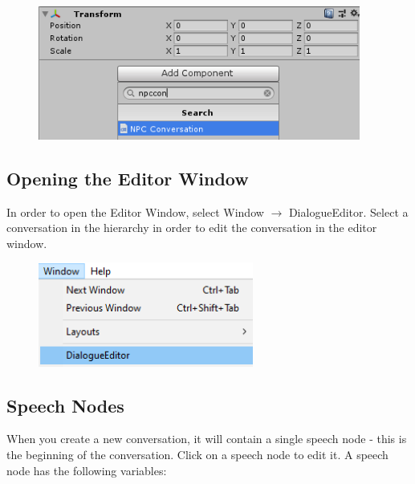 \documentclass[a4paper,12pt]{article}
\begin{document}
\begin{figure}[ht]
\centering
\includegraphics[width=300pt, keepaspectratio]{img/AddNpcConversation.png}
\end{figure}



\subsection{Opening the Editor Window}
In order to open the Editor Window, select Window $\rightarrow$ DialogueEditor. Select a conversation in the hierarchy in order to edit the conversation in the editor window.

\begin{figure}[h]
\centering
\includegraphics[width=200pt, keepaspectratio]{img/OpenEditorWindow.png}
\end{figure}

\newpage

\subsection{Speech Nodes}
When you create a new conversation, it will contain a single speech node - this is the beginning of the conversation. 
\newline
Click on a speech node to edit it. A speech node has the following variables:
\bigskip

\end{document}
